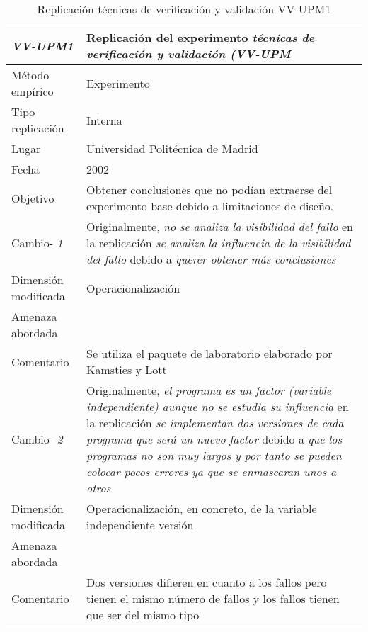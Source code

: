 
\begin{table}
\caption{Replicación técnicas de verificación y validación VV-UPM1}
\begin{tabular}{| p{3.3cm} | p{9cm} |}
\hline

\textbf {\textit{VV-UPM1}} & Replicación del experimento \textit{técnicas de verificación y validación (VV-UPM }    \\  \hline

Método empírico &  Experimento   \\  \hline
Tipo replicación &  Interna   \\  \hline
Lugar &  Universidad Politécnica de Madrid \\  \hline
Fecha &  2002   \\  \hline
Objetivo  &  Obtener conclusiones que no podían extraerse del experimento base debido a limitaciones de diseño. \\  \hline \hline
Cambio- \textit{1}   & \parbox[t]{9cm} {Originalmente,  \textit{ no se analiza la visibilidad del fallo  } } \parbox[t]{9cm}{en la replicación \textit{ se analiza la influencia de la visibilidad del fallo } }  debido a  \textit{querer obtener más conclusiones} \\  \hline
Dimensión modificada & Operacionalización
 \\  \hline 
Amenaza abordada  &   \\  \hline
Comentario  & Se utiliza el paquete de laboratorio elaborado por Kamsties y Lott  \\  \hline \hline

Cambio- \textit{2}   & \parbox[t]{9cm} {Originalmente,  \textit{ el programa es un factor (variable independiente) aunque no se estudia su influencia } } \parbox[t]{9cm}{en la replicación \textit{ se implementan dos versiones de cada programa que será un nuevo factor } }  debido a \textit{que los programas no son muy largos y por tanto se pueden colocar pocos errores ya que se enmascaran unos a otros } \\  \hline
Dimensión modificada & Operacionalización, en concreto, de la variable independiente versión
 \\  \hline 
Amenaza abordada  &   \\  \hline \hline
Comentario  & Dos versiones difieren en cuanto a los fallos pero tienen el mismo número de fallos y los fallos tienen que ser del mismo tipo \\  \hline \hline
 

\end{tabular}
\end{table}
